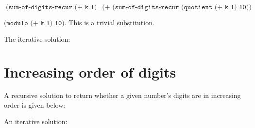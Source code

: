\documentclass{article}
\begin{document}
$\texttt{(sum-of-digits-recur (+ k 1)} = \texttt{(+ (sum-of-digits-recur (quotient (+ k 1) 10))}$

$\texttt{(modulo (+ k 1) 10)}$. This is a trivial substitution.

The iterative solution:



\section*{Increasing order of digits}

A recursive solution to return whether a given number's digits are in increasing order is given below:



An iterative solution:


\end{document}
